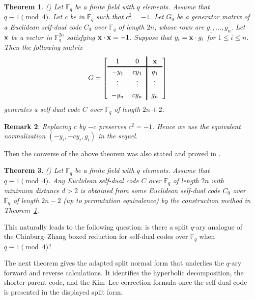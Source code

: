 \documentclass[12pt]{article}
\newtheorem{theorem}{Theorem}[section]
\newtheorem{remark}[theorem]{Remark}
\begin{document}
\begin{theorem}(\cite[Proposition 2.1]{KimLee}) \label{thm-q-ary-build-1}
Let $\mathbb F_q$ be a finite field with $q$ elements. Assume that $q \equiv 1 \pmod{4}$. Let $c$ be in $\mathbb F_q$ such that $c^2 = -1$. Let $G_0$ be a generator matrix of a Euclidean self-dual code $C_0$ over $\mathbb F_q$ of length $2n$, whose rows are $g_1, \dots, g_n$. Let $\bf x$ be a vector in $\mathbb F_q^{2n}$ satisfying ${\bf x} \cdot {\bf x} = -1$. Suppose that $y_i ={\bf x} \cdot g_i$ for $1 \le i \le n$. Then the following matrix
\[
\begingroup
\setlength{\arraycolsep}{6pt}
\renewcommand{\arraystretch}{1.2}
G=
\left[
\begin{array}{cc!{\vrule width 1.2pt}c}
1 & 0 & \mathbf{x}\\
\noalign{\hrule height 1.2pt}
-y_1 & c y_1 & g_1\\
\vdots & \vdots & \vdots\\
-y_n & c y_n & g_n
\end{array}
\right]
\endgroup
\]
generates a self-dual code $C$ over $\mathbb F_q$ of length $2n+2$.
\end{theorem}

\begin{remark}
\rm
Replacing \(c\) by \(-c\) preserves \(c^2=-1\).  Hence we use the equivalent
normalization \((-y_i,-cy_i,g_i)\) in the sequel.
\end{remark}

 Then the converse of the above theorem was also stated and proved in \cite{KimLee}.

\begin{theorem}(\cite[Proposition 2.2]{KimLee}) \label{thm-q-ary-build-2}
Let $\mathbb F_q$ be a finite field with $q$ elements. Assume that $q \equiv 1 \pmod{4}$. Any Euclidean self-dual code $C$ over $\mathbb F_q$ of length $2n$ with minimum distance $d >2$ is obtained from some Euclidean self-dual code $C_0$ over $\mathbb F_q$ of length $2n-2$ (up to permutation equivalence) by the construction method in Theorem~\ref{thm-q-ary-build-1}.
\end{theorem}

This naturally leads to the following question: is there a split \(q\)-ary analogue of the Chinburg--Zhang boxed reduction for self-dual codes over \(\mathbb F_q\) when \(q\equiv 1 \pmod 4\)?

The next theorem gives the adapted split normal form that underlies the \(q\)-ary forward and reverse calculations. It identifies the hyperbolic decomposition, the shorter parent code, and the Kim--Lee correction formula once the self-dual code is presented in the displayed split form.
\end{document}
